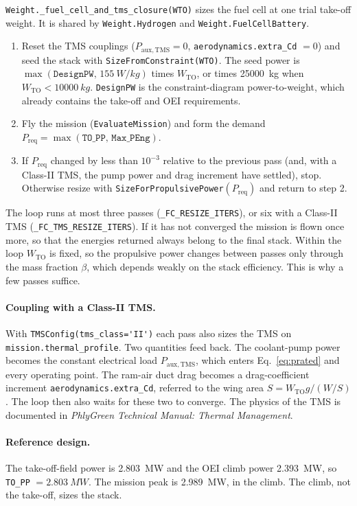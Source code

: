 \documentclass[a4paper,11pt]{article}
\newcommand{\code}[1]{\nolinkurl{#1}}
\newcommand{\fn}[1]{\nolinkurl{#1}}
\begin{document}
\fn{Weight._fuel_cell_and_tms_closure(WTO)} sizes the fuel cell at one trial take-off weight.
It is shared by \fn{Weight.Hydrogen} and \fn{Weight.FuelCellBattery}.
\begin{enumerate}
  \item Reset the TMS couplings ($P_\mathrm{aux,TMS}=0$, \code{aerodynamics.extra_Cd} $=0$) and
  seed the stack with \fn{SizeFromConstraint(WTO)}. The seed power is
  $\max(\mathtt{DesignPW},\,\SI{155}{W/kg})$ times $W_\mathrm{TO}$, or times \SI{25000}{kg}
  when $W_\mathrm{TO}<\SI{10000}{kg}$. \code{DesignPW} is the constraint-diagram
  power-to-weight, which already contains the take-off and OEI requirements.
  \item Fly the mission (\fn{EvaluateMission}) and form the demand
  $P_\mathrm{req}=\max(\mathtt{TO\_PP},\,\mathtt{Max\_PEng})$.
  \item If $P_\mathrm{req}$ changed by less than $10^{-3}$ relative to the previous pass (and,
  with a Class-II TMS, the pump power and drag increment have settled), stop. Otherwise resize
  with \fn{SizeForPropulsivePower}$(P_\mathrm{req})$ and return to step 2.
\end{enumerate}
The loop runs at most three passes (\code{_FC_RESIZE_ITERS}), or six with a Class-II TMS
(\code{_FC_TMS_RESIZE_ITERS}). If it has not converged the mission is flown once more, so that
the energies returned always belong to the final stack. Within the loop $W_\mathrm{TO}$ is
fixed, so the propulsive power changes between passes only through the mass fraction $\beta$,
which depends weakly on the stack efficiency. This is why a few passes suffice.

\paragraph{Coupling with a Class-II TMS.} With \code{TMSConfig(tms_class='II')} each pass also
sizes the TMS on \code{mission.thermal_profile}. Two quantities feed back. The coolant-pump
power becomes the constant electrical load $P_\mathrm{aux,TMS}$, which enters
Eq.~\eqref{eq:prated} and every operating point. The ram-air duct drag becomes a drag-coefficient
increment \code{aerodynamics.extra_Cd}, referred to the wing area
$S=W_\mathrm{TO}g/(W/S)$. The loop then also waits for these two to converge. The physics of
the TMS is documented in \emph{PhlyGreen Technical Manual: Thermal Management}.

\paragraph{Reference design.} The take-off-field power is \SI{2.803}{MW} and the OEI climb
power \SI{2.393}{MW}, so \code{TO_PP} $=\SI{2.803}{MW}$. The mission peak is \SI{2.989}{MW}, in
the climb. The climb, not the take-off, sizes the stack.
\end{document}
